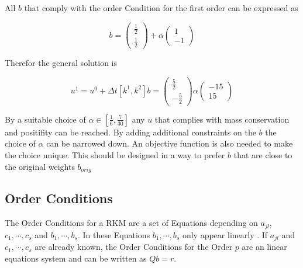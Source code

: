 \documentclass{article}
\begin{document}
All $b$ that comply with the order Condition for the first order can be expressed as

\begin{equation}
b= \left(\begin{matrix}\frac{1}{2}\\ \frac{1}{2}\end{matrix}\right) + \alpha \left(\begin{matrix}1\\ -1\end{matrix}\right)
\end{equation}

Therefor the general solution is 

\begin{equation}
u^{1} = u^0 + \Delta t  \left[k^1,k^2\right] b = \left(\begin{matrix}\frac{5}{2}\\- \frac{5}{2}\end{matrix}\right) \alpha  \left(\begin{matrix}-15\\15\end{matrix}\right)
\end{equation}

By a suitable choice of $\alpha \in [\frac{1}{6},\frac{7}{30}]$ any $u$ that complies with mass conservation and positifity can be reached. 
By adding additional constraints on the $b$ the choice of $\alpha$ can be narrowed down. 
An objective function is also needed to make the choice unique. This should be designed in a way to prefer $b$ that are close to the original weights $b_{orig}$






\subsection{Order Conditions}\label{sec:OrderCond}

The Order Conditions for a RKM are a set of Equations depending on $a_{jl}$, $c_1,\cdots,c_s$ and $b_1,\cdots,b_s$. In these Equations $b_1,\cdots,b_s$ only appear linearly \cite{hairer_runge-kutta_1993}.
If $a_{jl}$ and $c_1,\cdots,c_s$ are already known, the Order Conditions for the Order $p$ are an linear equations system and can be written as $Q b = r$. 
\end{document}
